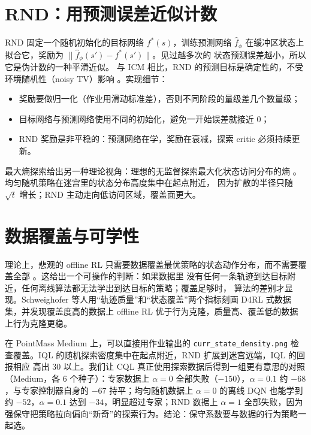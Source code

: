 \documentclass[10pt,twocolumn,a4paper]{ctexart}
\begin{document}
\section{RND：用预测误差近似计数}
RND 固定一个随机初始化的目标网络 $f^*(s)$，训练预测网络 $\hat f_\phi$ 在缓冲区状态上
拟合它，奖励为 $\lVert\hat f_\phi(s')-f^*(s')\rVert$\citep{burda2019rnd}。见过越多次的
状态预测误差越小，所以它是伪计数的一种平滑近似\citep{bellemare2016count,tang2017exploration}。
与 ICM 相比，RND 的预测目标是确定性的，不受环境随机性（noisy TV）影响
\citep{pathak2017icm}。实现细节：
\begin{itemize}
\item 奖励要做归一化（作业用滑动标准差），否则不同阶段的量级差几个数量级；
\item 目标网络与预测网络使用不同的初始化，避免一开始误差就接近 $0$；
\item RND 奖励是非平稳的：预测网络在学，奖励在衰减，探索 critic 必须持续更新。
\end{itemize}
最大熵探索给出另一种理论视角：理想的无监督探索最大化状态访问分布的熵
\citep{hazan2019maxent}。均匀随机策略在迷宫里的状态分布高度集中在起点附近，
因为扩散的半径只随 $\sqrt{t}$ 增长；RND 主动走向低访问区域，覆盖面更大。

\section{数据覆盖与可学性}
理论上，悲观的 offline RL 只需要数据覆盖最优策略的状态动作分布，而不需要覆盖全部
\citep{jin2021pessimism,rashidinejad2021bridging}。这给出一个可操作的判断：如果数据里
没有任何一条轨迹到达目标附近，任何离线算法都无法学出到达目标的策略；覆盖足够时，
算法的差别才显现。Schweighofer 等人用“轨迹质量”和“状态覆盖”两个指标刻画
D4RL 式数据集，并发现覆盖度高的数据上 offline RL 优于行为克隆，质量高、覆盖低的数据
上行为克隆更稳\citep{schweighofer2022dataset,kumar2022should}。

在 PointMass Medium 上，可以直接用作业输出的 \texttt{curr\_state\_density.png}
检查覆盖。IQL 的随机探索密度集中在起点附近，RND 扩展到迷宫远端，IQL 的回报相应
高出 $30$ 以上。我们让 CQL 真正使用探索数据后得到一组更有意思的对照
（Medium，各 $6$ 个种子）：专家数据上 $\alpha=0$ 全部失败（$-150$），$\alpha=0.1$ 约
$-68$，与专家控制器自身的 $-67$ 持平；均匀随机数据上 $\alpha=0$ 的离线 DQN 也能学到
约 $-52$，$\alpha=0.1$ 达到 $-34$，明显超过专家；RND 数据上 $\alpha=1$ 全部失败，因为
强保守把策略拉向偏向“新奇”的探索行为。结论：保守系数要与数据的行为策略一起选。
\end{document}
